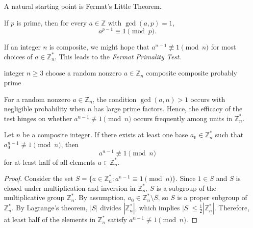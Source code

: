 A natural starting point is Fermat's Little Theorem.

\begin{theorem}
    If \(p\) is prime, then for every \(a \in \mathbb{Z}\) with \(\gcd(a, p) = 1\),
    \[
        a^{p-1} \equiv 1 \pmod{p}.
    \]
\end{theorem}

If an integer \(n\) is composite, we might hope that \(a^{n-1} \not\equiv 1 \pmod{n}\) for most choices of \(a \in \mathbb{Z}_n^*\).
This leads to the \emph{Fermat Primality Test}.

\begin{algorithm}[htbp]
    \caption{Fermat Primality Test}\label{alg:fermat-test}
    \begin{algorithmic}[1]
        \Input integer \(n \geq 3\)
        \State choose a random nonzero \(a \in \mathbb{Z}_n\)
            \State \Return \textup{composite}
        \EndIf
            \State \Return \textup{composite}
        \Else
            \State \Return \textup{probably prime}
        \EndIf
    \end{algorithmic}
\end{algorithm}

For a random nonzero \(a \in \mathbb{Z}_n\), the condition \(\gcd(a, n) > 1\) occurs with negligible probability when \(n\) has large prime factors.
Hence, the efficacy of the test hinges on whether \(a^{n-1} \not\equiv 1 \pmod{n}\) occurs frequently among units in \(\mathbb{Z}_n^*\).

\begin{proposition}\label{prop:fermat-subgroup}
    Let \(n\) be a composite integer.
    If there exists at least one base \(a_0 \in \mathbb{Z}_n^*\) such that \(a_0^{n-1} \not\equiv 1 \pmod{n}\), then
    \[
        a^{n-1} \not\equiv 1 \pmod{n}
    \]
    for at least half of all elements \(a \in \mathbb{Z}_n^*\).
\end{proposition}

\begin{proof}
    Consider the set \( S = \{a \in \mathbb{Z}_n^* : a^{n-1} \equiv 1 \pmod{n}\}\).
    Since \(1 \in S\) and \(S\) is closed under multiplication and inversion in \(\mathbb{Z}_n^*\), \(S\) is a subgroup of the multiplicative group \(\mathbb{Z}_n^*\).
    By assumption, \(a_0 \in \mathbb{Z}_n^* \setminus S\), so \(S\) is a proper subgroup of \(\mathbb{Z}_n^*\).
    By Lagrange's theorem, \(|S|\) divides \(|\mathbb{Z}_n^*|\), which implies \( |S| \leq \frac{1}{2} |\mathbb{Z}_n^*|\).
    Therefore, at least half of the elements in \(\mathbb{Z}_n^*\) satisfy \(a^{n-1} \not\equiv 1 \pmod{n}\).
\end{proof}

